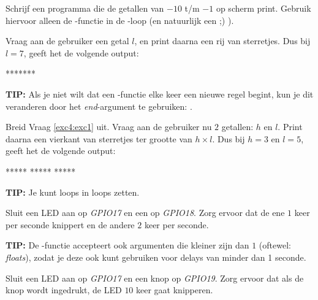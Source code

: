 \begin{exercise}
Schrijf een programma die de getallen van $-10$ t/m $-1$ op scherm print. Gebruik hiervoor alleen de -functie in de -loop (en natuurlijk een  ;) ).
\end{exercise}

\begin{exercise}\label{exc5:exc4}
Vraag aan de gebruiker een getal $l$, en print daarna een rij van sterretjes. Dus bij $l=7$, geeft het de volgende output:
\begin{python}
*******
\end{python}
\textbf{TIP:} Als je niet wilt dat een -functie elke keer een nieuwe regel begint, kun je dit veranderen door het \textit{end}-argument te gebruiken: . 
\end{exercise}


\begin{exercise}
Breid Vraag \ref{exc4:exc1} uit. Vraag aan de gebruiker nu $2$ getallen: $h$ en $l$. Print daarna een vierkant van sterretjes ter grootte van $h \times l$. Dus bij $h=3$ en $l=5$, geeft het de volgende output:
\begin{python}
*****
*****
*****
\end{python}
\textbf{TIP:} Je kunt loops in loops zetten. 
\end{exercise}

\begin{exercise}
Sluit een LED aan op \textit{GPIO17} en een op \textit{GPIO18}. Zorg ervoor dat de ene $1$ keer per seconde knippert en de andere $2$ keer per seconde. 

\textbf{TIP:} De -functie accepteert ook argumenten die kleiner zijn dan $1$ (oftewel: \textit{floats}), zodat je deze ook kunt gebruiken voor delays van minder dan 1 seconde.
\end{exercise}

\begin{exercise}
Sluit een LED aan op \textit{GPIO17} en een knop op \textit{GPIO19}. Zorg ervoor dat als de knop wordt ingedrukt, de LED $10$ keer gaat knipperen. 
\end{exercise}
